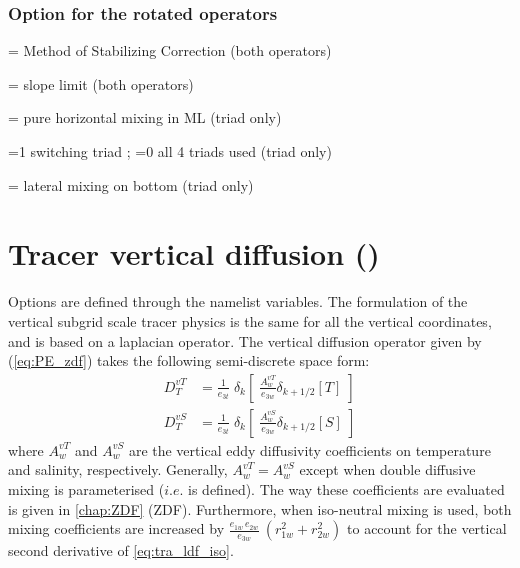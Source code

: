 \documentclass[../tex_main/NEMO_manual]{subfiles}
\begin{document}
\subsubsection{Option for the rotated operators}
\label{subsec:TRA_ldf_options}

 = Method of Stabilizing Correction (both operators)

 = slope limit (both operators)

 = pure horizontal mixing in ML (triad only)

 =1 switching triad ; =0 all 4 triads used (triad only) 

 = lateral mixing on bottom (triad only)

\section{Tracer vertical diffusion (\protect{})}
\label{sec:TRA_zdf}


Options are defined through the  namelist variables.
The formulation of the vertical subgrid scale tracer physics is the same 
for all the vertical coordinates, and is based on a laplacian operator. 
The vertical diffusion operator given by (\autoref{eq:PE_zdf}) takes the 
following semi-discrete space form:
\begin{equation} \label{eq:tra_zdf}
\begin{split}
D^{vT}_T &= \frac{1}{e_{3t}} \; \delta_k \left[ \;\frac{A^{vT}_w}{e_{3w}}  \delta_{k+1/2}[T] \;\right] 
\\
D^{vS}_T &= \frac{1}{e_{3t}} \; \delta_k \left[ \;\frac{A^{vS}_w}{e_{3w}}  \delta_{k+1/2}[S] \;\right] 
\end{split}
\end{equation}
where $A_w^{vT}$ and $A_w^{vS}$ are the vertical eddy diffusivity 
coefficients on temperature and salinity, respectively. Generally, 
$A_w^{vT}=A_w^{vS}$ except when double diffusive mixing is 
parameterised ($i.e.$  is defined). The way these coefficients 
are evaluated is given in \autoref{chap:ZDF} (ZDF). Furthermore, when 
iso-neutral mixing is used, both mixing coefficients are increased 
by $\frac{e_{1w}\,e_{2w} }{e_{3w} }\ \left( {r_{1w} ^2+r_{2w} ^2} \right)$ 
to account for the vertical second derivative of \autoref{eq:tra_ldf_iso}. 
\end{document}
